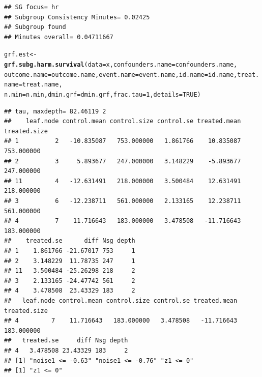 \documentclass[smallextended]{svjour3}
\makeatletter
\newcommand{\hlnum}[1]{\textcolor[rgb]{0.686,0.059,0.569}{#1}}%
\newcommand{\hlstd}[1]{\textcolor[rgb]{0.345,0.345,0.345}{#1}}%
\newcommand{\hlkwb}[1]{\textcolor[rgb]{0.69,0.353,0.396}{#1}}%
\newcommand{\hlkwc}[1]{\textcolor[rgb]{0.333,0.667,0.333}{#1}}%
\newcommand{\hlkwd}[1]{\textcolor[rgb]{0.737,0.353,0.396}{\textbf{#1}}}%
\newenvironment{kframe}{%
 \def\at@end@of@kframe{}%
 \ifinner\ifhmode%
  \def\at@end@of@kframe{\end{minipage}}%
  \begin{minipage}{\columnwidth}%
 \fi\fi%
 \def\FrameCommand##1{\hskip\@totalleftmargin \hskip-\fboxsep
 \colorbox{shadecolor}{##1}\hskip-\fboxsep
     \hskip-\linewidth \hskip-\@totalleftmargin \hskip\columnwidth}%
 \MakeFramed {\advance\hsize-\width
   \@totalleftmargin\z@ \linewidth\hsize
   \@setminipage}}%
 {\par\unskip\endMakeFramed%
 \at@end@of@kframe}
\newenvironment{knitrout}{}{} %
\makeatother
\begin{document}
\begin{knitrout}
\begin{kframe}
\begin{verbatim}
## SG focus= hr 
## Subgroup Consistency Minutes= 0.02425 
## Subgroup found 
## Minutes overall= 0.04711667
\end{verbatim}
\begin{alltt}
\hlstd{grf.est} \hlkwb{<-} \hlkwd{grf.subg.harm.survival}\hlstd{(}\hlkwc{data} \hlstd{= x,} \hlkwc{confounders.name} \hlstd{= confounders.name,}
    \hlkwc{outcome.name} \hlstd{= outcome.name,} \hlkwc{event.name} \hlstd{= event.name,} \hlkwc{id.name} \hlstd{= id.name,} \hlkwc{treat.name} \hlstd{= treat.name,}
    \hlkwc{n.min} \hlstd{= n.min,} \hlkwc{dmin.grf} \hlstd{= dmin.grf,} \hlkwc{frac.tau} \hlstd{=} \hlnum{1}\hlstd{,} \hlkwc{details} \hlstd{=} \hlnum{TRUE}\hlstd{)}
\end{alltt}
\begin{verbatim}
## tau, maxdepth= 82.46119 2 
##    leaf.node control.mean control.size control.se treated.mean treated.size
## 1          2   -10.835087   753.000000   1.861766    10.835087   753.000000
## 2          3     5.893677   247.000000   3.148229    -5.893677   247.000000
## 11         4   -12.631491   218.000000   3.500484    12.631491   218.000000
## 3          6   -12.238711   561.000000   2.133165    12.238711   561.000000
## 4          7    11.716643   183.000000   3.478508   -11.716643   183.000000
##    treated.se      diff Nsg depth
## 1    1.861766 -21.67017 753     1
## 2    3.148229  11.78735 247     1
## 11   3.500484 -25.26298 218     2
## 3    2.133165 -24.47742 561     2
## 4    3.478508  23.43329 183     2
##   leaf.node control.mean control.size control.se treated.mean treated.size
## 4         7    11.716643   183.000000   3.478508   -11.716643   183.000000
##   treated.se     diff Nsg depth
## 4   3.478508 23.43329 183     2
## [1] "noise1 <= -0.63" "noise1 <= -0.76" "z1 <= 0"        
## [1] "z1 <= 0"
\end{verbatim}
\end{kframe}
\end{knitrout}
\end{document}
